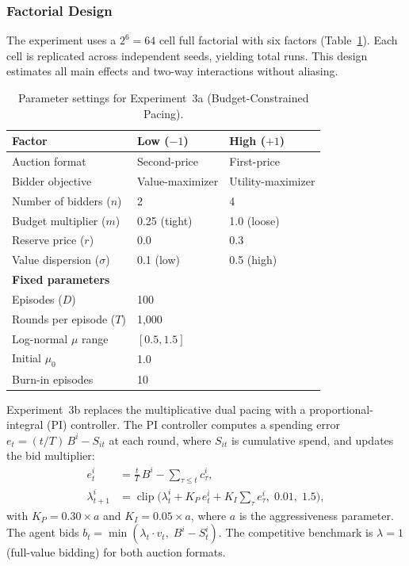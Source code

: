 \subsubsection{Factorial Design}

The experiment uses a $2^6 = 64$ cell full factorial with six factors (Table~\ref{tab:exp3a_params}). Each cell is replicated across independent seeds, yielding \ExpThreeANobs{} total runs. This design estimates all main effects and two-way interactions without aliasing.

\begin{table}[H]
\centering
\caption{Parameter settings for Experiment~3a (Budget-Constrained Pacing).}
\label{tab:exp3a_params}
\begin{tabular}{l l l}
\toprule
\textbf{Factor} & \textbf{Low ($-1$)} & \textbf{High ($+1$)}\\
\midrule
Auction format & Second-price & First-price \\
Bidder objective & Value-maximizer & Utility-maximizer \\
Number of bidders ($n$) & 2 & 4 \\
Budget multiplier ($m$) & 0.25 (tight) & 1.0 (loose) \\
Reserve price ($r$) & 0.0 & 0.3 \\
Value dispersion ($\sigma$) & 0.1 (low) & 0.5 (high) \\
\midrule
\multicolumn{3}{l}{\textbf{Fixed parameters}} \\
\midrule
Episodes ($D$) & \multicolumn{2}{l}{100} \\
Rounds per episode ($T$) & \multicolumn{2}{l}{1{,}000} \\
Log-normal $\mu$ range & \multicolumn{2}{l}{$[0.5, 1.5]$} \\
Initial $\mu_0$ & \multicolumn{2}{l}{1.0} \\
Burn-in episodes & \multicolumn{2}{l}{10} \\
\bottomrule
\end{tabular}
\end{table}

\label{sec:exp3b_design}
\label{sec:exp3b_appendix}

Experiment~3b replaces the multiplicative dual pacing with a proportional-integral (PI) controller. The PI controller computes a spending error $e_t = (t/T)\,B^i - S_{it}$ at each round, where $S_{it}$ is cumulative spend, and updates the bid multiplier:
\begin{align}
  e_t^i &= \tfrac{t}{T}\,B^i - {\textstyle\sum_{\tau \le t}} c_\tau^i, \label{eq:pid_error_exp3b}\\
  \lambda_{t+1}^i &= \operatorname{clip}\!\bigl(\lambda_t^i + K_P\,e_t^i + K_I\!\textstyle\sum_{\tau} e_\tau^i,\; 0.01,\; 1.5\bigr), \label{eq:pid_update_exp3b}
\end{align}
with $K_P = 0.30 \times a$ and $K_I = 0.05 \times a$, where $a$ is the aggressiveness parameter. The agent bids $b_t = \min(\lambda_t \cdot v_t,\; B^i - S_t^i)$. The competitive benchmark is $\lambda = 1$ (full-value bidding) for both auction formats.

